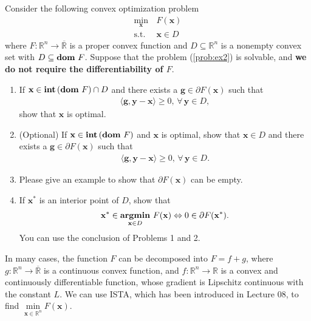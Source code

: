 \documentclass[11pt,letter,notitlepage]{article}
\DeclareMathOperator*{\argmin}{\bf argmin}
\DeclareMathOperator*{\dom}{\bf dom\,}
\DeclareMathOperator*{\intp}{\bf int\,}
\begin{document}
\newpage
\begin{exercise}
Consider the following convex optimization problem
\begin{align}\label{prob:ex2}
    \min_\textbf{x}\, &F(\textbf{x})\\
    \nonumber\text{s.t.} &\textbf{x}\in D
\end{align}
where $F:\mathbb{R}^n\rightarrow\overline{\mathbb{R}}$ is a proper convex function and $D\subseteq\mathbb{R}^n$
is a nonempty convex set with $D\subseteq\dom F$. Suppose that the problem (\ref{prob:ex2}) is solvable, and {\bf we do not require the differentiability of $F$}.
\begin{enumerate}
    \item If $\textbf{x}\in\intp(\dom F) \cap D$ and there exists a $\textbf{g}\in\partial F(\textbf{x})$ such that
    \begin{align*}
        \langle \textbf{g},\textbf{y}-\textbf{x} \rangle\ge 0,\, \forall\, \textbf{y}\in D,
    \end{align*}
    show that $\textbf{x}$ is optimal.
    
    \item (Optional) If $\textbf{x}\in\intp(\dom F)$ and $\textbf{x}$ is optimal, show that $\textbf{x}\in D$ and there exists a $\textbf{g}\in\partial F(\textbf{x})$ such that
    \begin{align*}
        \langle \textbf{g},\textbf{y}-\textbf{x} \rangle\ge 0,\, \forall\, \textbf{y}\in D.
    \end{align*}
    
    \item Please give an example to show that $\partial F(\textbf{x})$ can be empty.
    
    \item If $\textbf{x}^*$ is an interior point of $D$, show that
    \begin{align*}
        \mathbf{x}^*\in\argmin_{\mathbf{x}\in D}\,F(\mathbf{x})\Leftrightarrow 0\in\partial F(\mathbf{x}^*).
    \end{align*}
    You can use the conclusion of Problems 1 and 2.
\end{enumerate}
In many cases, the function $F$ can be decomposed into $F=f+g$,
where $g:\mathbb{R}^n\to\overline{\mathbb{R}}$ is a continuous convex function, and $f:\mathbb{R}^n\to\mathbb{R}$ is a convex and continuously differentiable function, whose gradient is Lipschitz continuous with the constant $L$.
We can use ISTA, which has been introduced in Lecture 08, to find $\min\limits_{\textbf{x}\in\mathbb{R}^n} F(\textbf{x})$.


\end{exercise}
\end{document}
